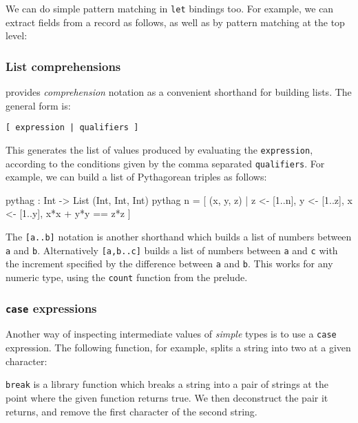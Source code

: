 \noindent
We can do simple pattern matching in \texttt{let} bindings too.
For example, we can extract fields from a record as follows, as well as by pattern matching at the top level:


\subsubsection*{List comprehensions}
\label{sec:listcomp}

\Idris{} provides \emph{comprehension} notation as a convenient shorthand for building lists.
The general form is:

\begin{lstlisting}[style=stdout]
[ expression | qualifiers ]
\end{lstlisting}

\noindent
This generates the list of values produced by evaluating the \texttt{expression}, according to the conditions given by the comma separated \texttt{qualifiers}.
For example, we can build a list of Pythagorean triples as follows:

\begin{code}
pythag : Int -> List (Int, Int, Int)
pythag n = [ (x, y, z) | z <- [1..n], y <- [1..z], x <- [1..y],
                         x*x + y*y == z*z ]
\end{code}


\noindent
The \texttt{[a..b]} notation is another shorthand which builds a list of numbers between \texttt{a} and \texttt{b}.
Alternatively \texttt{[a,b..c]} builds a list of numbers between \texttt{a} and \texttt{c} with the increment specified by the difference between \texttt{a} and \texttt{b}.
This works for any numeric type, using the \texttt{count} function from the prelude.

\subsubsection*{\texttt{case} expressions}

Another way of inspecting intermediate values of \emph{simple} types
is to use a \texttt{case} expression.
The following function, for example, splits a string into two at a given character:


\noindent
\texttt{break} is a library function which breaks a string into a pair of strings
at the point where the given function returns true.
We then deconstruct the pair it returns, and remove the first character of the second string.

